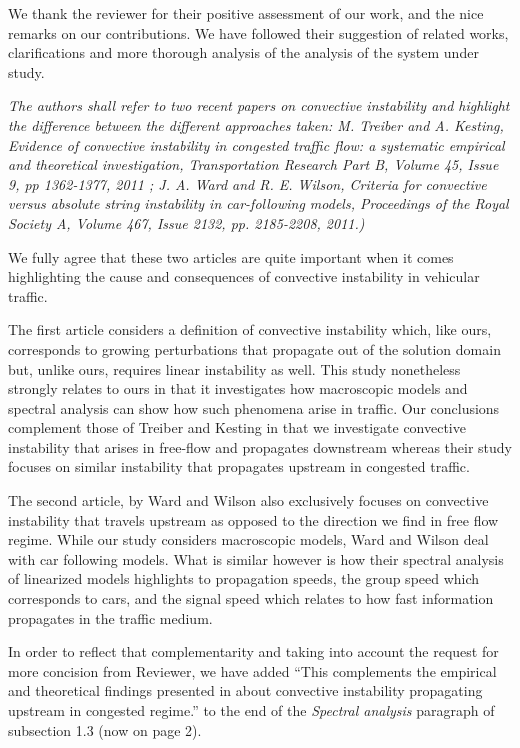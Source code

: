 \documentclass{article}
\begin{document}
We thank the reviewer for their positive assessment of our work, and the nice remarks on our contributions. We have followed their suggestion of related works, clarifications and more thorough analysis of the analysis of the system under study.\\

\bigskip{}

\emph{
The authors shall refer to two recent papers on convective instability and highlight the difference between the different approaches taken: M. Treiber and A. Kesting, Evidence of convective instability in congested traffic flow: a systematic empirical and theoretical investigation, Transportation Research Part B, Volume 45, Issue 9, pp 1362-1377, 2011 ; J. A. Ward and R. E. Wilson, Criteria for convective versus absolute string instability in car-following models, Proceedings of the Royal Society A, Volume 467, Issue 2132, pp. 2185-2208, 2011.)
}

We fully agree that these two articles are quite important when it comes highlighting the cause and consequences of convective instability in vehicular traffic.

The first article considers a definition of convective instability which, like ours, corresponds to growing perturbations that propagate out of the solution domain but, unlike ours, requires linear instability as well. This study nonetheless strongly relates to ours in that it investigates how macroscopic models and spectral analysis can show how such phenomena arise in traffic. Our conclusions complement those of Treiber and Kesting in that we investigate convective instability that arises in free-flow and propagates downstream whereas their study focuses on similar instability that propagates upstream in congested traffic.

The second article, by Ward and Wilson also exclusively focuses on convective instability that travels upstream as opposed to the direction we find in free flow regime. While our study considers macroscopic models, Ward and Wilson deal with car following models. What is similar however is how their spectral analysis of linearized models highlights to propagation speeds, the group speed which corresponds to cars, and the signal speed which relates to how fast information propagates in the traffic medium.

In order to reflect that complementarity and taking into account the request for more concision from Reviewer, we have added ``This complements the empirical and theoretical findings presented in \cite{treiber2011evidence,wardWilson2011} about convective instability propagating upstream in congested regime.'' to the end of the \textit{Spectral analysis} paragraph of subsection 1.3 (now on page 2).
\end{document}
